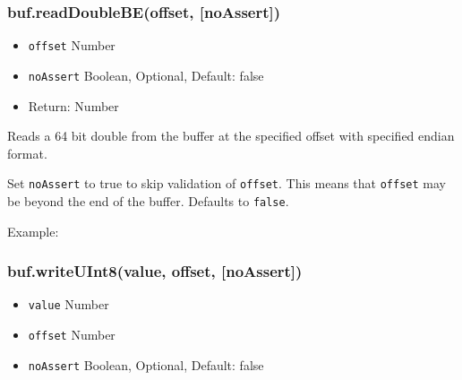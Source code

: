 \subsubsection{buf.readDoubleBE(offset, {[}noAssert{]})}

\begin{itemize}
\item
  \texttt{offset} Number
\item
  \texttt{noAssert} Boolean, Optional, Default: false
\item
  Return: Number
\end{itemize}

Reads a 64 bit double from the buffer at the specified offset with
specified endian format.

Set \texttt{noAssert} to true to skip validation of \texttt{offset}.
This means that \texttt{offset} may be beyond the end of the buffer.
Defaults to \texttt{false}.

Example:

\begin{Shaded}
\begin{Highlighting}[]
  \NormalTok{);}

\NormalTok{buf[}\NormalTok{] = }\NormalTok{;}
\NormalTok{buf[}\NormalTok{] = }\NormalTok{;}
\NormalTok{buf[}\NormalTok{] = }\NormalTok{;}
\NormalTok{buf[}\NormalTok{] = }\NormalTok{;}
\NormalTok{buf[}\NormalTok{] = }\NormalTok{;}
\NormalTok{buf[}\NormalTok{] = }\NormalTok{;}
\NormalTok{buf[}\NormalTok{] = }\NormalTok{;}
\NormalTok{buf[}\NormalTok{] = }\NormalTok{;}

\NormalTok{(}\NormalTok{(}\NormalTok{));}

\end{Highlighting}
\end{Shaded}

\subsubsection{buf.writeUInt8(value, offset, {[}noAssert{]})}

\begin{itemize}
\item
  \texttt{value} Number
\item
  \texttt{offset} Number
\item
  \texttt{noAssert} Boolean, Optional, Default: false
\end{itemize}

